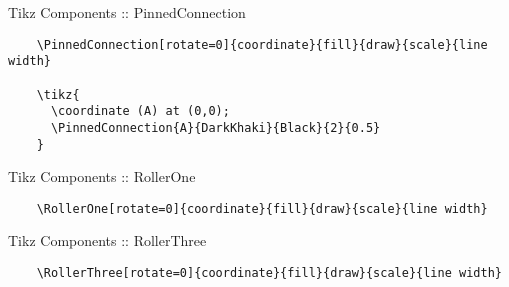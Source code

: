 \documentclass[9pt,xcolor={svgnames, x11names}]{beamer}
\begin{document}

\begin{frame}[fragile]{Tikz Components :: PinnedConnection}
	
	\small
	\begin{verbatim}
    \PinnedConnection[rotate=0]{coordinate}{fill}{draw}{scale}{line width}

    \tikz{
      \coordinate (A) at (0,0);
      \PinnedConnection{A}{DarkKhaki}{Black}{2}{0.5}
    }
  \end{verbatim}
	
	\vspace{1cm}
	
	
\end{frame}

\begin{frame}[fragile]{Tikz Components :: RollerOne}
	
	\footnotesize
	\begin{verbatim}
    \RollerOne[rotate=0]{coordinate}{fill}{draw}{scale}{line width}
  \end{verbatim}
	
	\vspace{1cm}
	
	
\end{frame}

\begin{frame}[fragile]{Tikz Components :: RollerThree}
	
	\footnotesize
	\begin{verbatim}
    \RollerThree[rotate=0]{coordinate}{fill}{draw}{scale}{line width}
  \end{verbatim}
	
	\vspace{1cm}
	
	
\end{frame}
\end{document}
